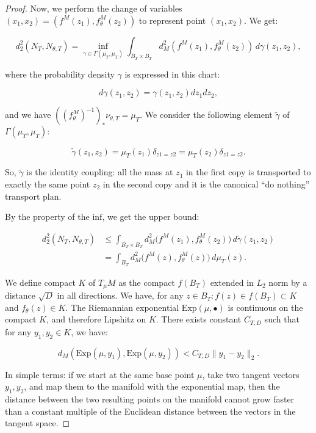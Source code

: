 \documentclass{article}
\begin{document}
\begin{proof}
Now, we perform the change of variables $(x_1, x_2)=(f^M(z_1), f^M_\theta(z_2))$ to represent 
point $(x_1,x_2)$. We get:

\[
    d_2^2(N_T,N_{\theta,T}) =
        \inf_{\gamma \in \Gamma(\mu_T, \mu_T)}
        \int_{B_T \times B_T}
        d_M^2(f^M(z_1), f^M_\theta(z_2)) \, d\gamma(z_1, z_2),
\]

where the probability density $\gamma$ is expressed in this chart:

\[
 d\gamma(z_1, z_2) = \gamma(z_1, z_2)dz_1dz_2,
\]

and we have $((f^M_\theta)^{-1})_*\nu_{\theta,T} = \mu_T$. We consider the following element $\tilde{\gamma}$ of $\Gamma(\mu_T, \mu_T)$:

\[
 \tilde{\gamma}(z_1,z_2) = \mu_T(z_1)\delta_{z1=z2} = \mu_T(z_2)\delta_{z1=z2}.
\]

So, $\tilde{\gamma}$ is the identity coupling: all the mass at $z_1$ in the first copy is transported to exactly the same point 
$z_2$ in the second copy and it is the canonical “do nothing” transport plan.

By the property of the $\mathrm{inf}$, we get the upper bound:

\[
\begin{aligned}
d_2^2(N_T,N_{\theta,T})
   &\le \int_{B_T \times B_T}
        d_M^2\!\bigl(f^M(z_1), f^M_\theta(z_2)\bigr) \, d\tilde{\gamma}(z_1, z_2) \\[6pt]
   &= \int_{B_T}
        d_M^2\!\bigl(f^M(z), f^M_\theta(z)\bigr) \, d\mu_T(z).
\end{aligned}
\]

We define compact $K$ of $T_\mu M$ as the compact $f(B_T)$ extended in $L_2$ norm by a distance $\sqrt D$ in 
all directions. We have, for any $z \in B_T : f(z) \in f(B_T) \subset K$ and $f_\theta(z) \in K$. 
The Riemannian exponential $\mathrm{Exp}(\mu,\bullet)$ is continuous on the compact $K$, and therefore Lipshitz on $K$. 
There exists constant $C_{T,D}$ such that for any $y_1, y_2 \in K$, we have:

\[
d_M(\mathrm{Exp}(\mu,y_1), \mathrm{Exp}(\mu,y_2)) < C_{T,D}\|y_1-y_2\|_2.
\]

In simple terms: if we start at the same base point $\mu$, take two tangent vectors 
$y_1, y_2$, and map them to the manifold with the exponential map, then the distance 
between the two resulting points on the manifold cannot grow faster than a constant 
multiple of the Euclidean distance between the vectors in the tangent space.


\end{proof}
\end{document}
